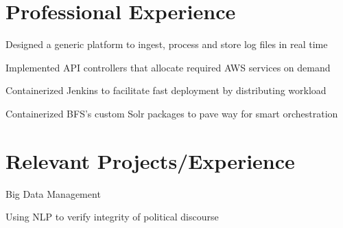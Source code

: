 \documentclass[]{deedy-resume-openfont}
\begin{document}
\begin{minipage}[t]{0.66\textwidth} 


\section{Professional Experience}

\sectionsep

\vspace{\topsep} %
\begin{tightemize}
\item Designed a generic platform to ingest, process and store log files in real time
\item Implemented API controllers that allocate required AWS services on demand
\end{tightemize}
\sectionsep

\begin{tightemize}
\item Containerized Jenkins to facilitate fast deployment by distributing workload
\item Containerized BFS’s custom Solr packages to pave way for smart orchestration
\end{tightemize}
\sectionsep


\section{Relevant Projects/Experience}

\begin{tightemize}
\item Big Data Management
\item Using NLP to verify integrity of political discourse
\end{tightemize}
\sectionsep


\end{minipage}
\end{document}
